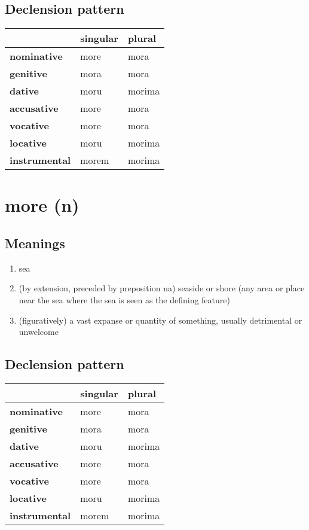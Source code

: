 \subsection*{Declension pattern}
\begin{tabularx}{\linewidth}{Xll}
\toprule
{} & singular &  plural \\
\midrule
\textbf{nominative  } &     more &    mora \\
\textbf{genitive    } &     mora &    mora \\
\textbf{dative      } &     moru &  morima \\
\textbf{accusative  } &     more &    mora \\
\textbf{vocative    } &     more &    mora \\
\textbf{locative    } &     moru &  morima \\
\textbf{instrumental} &    morem &  morima \\
\bottomrule
\end{tabularx}

\filbreak
\section{more (n)}
\subsection*{Meanings}
\begin{enumerate}
\item sea
\item (by extension, preceded by preposition na) seaside or shore (any area or place near the sea where the sea is seen as the defining feature)
\item (figuratively) a vast expanse or quantity of something, usually detrimental or unwelcome
\end{enumerate}
\subsection*{Declension pattern}
\begin{tabularx}{\linewidth}{Xll}
\toprule
{} & singular &  plural \\
\midrule
\textbf{nominative  } &     more &    mora \\
\textbf{genitive    } &     mora &    mora \\
\textbf{dative      } &     moru &  morima \\
\textbf{accusative  } &     more &    mora \\
\textbf{vocative    } &     more &    mora \\
\textbf{locative    } &     moru &  morima \\
\textbf{instrumental} &    morem &  morima \\
\bottomrule
\end{tabularx}

